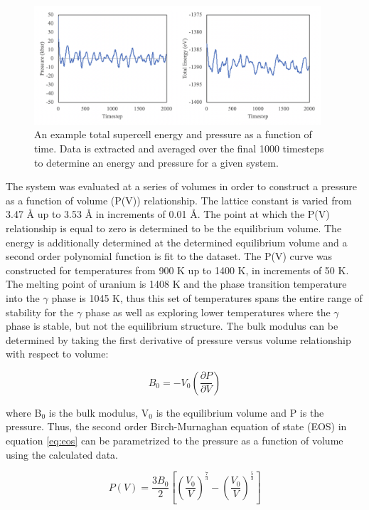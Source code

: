 \documentclass[review]{elsarticle}
\begin{document}
\begin{figure}[h]
 \centering
 \includegraphics[width=0.95\textwidth]{1_convergence.png} 
 \caption{An example total supercell energy and pressure as a function of time. Data is extracted and averaged over the final 1000 timesteps to determine an energy and pressure for a given system. }
 \label{fig:convergence}
\end{figure}

\FloatBarrier

The system was evaluated at a series of volumes in order to construct a pressure as a function of volume (P(V)) relationship. The lattice constant is varied from 3.47 {\AA} up to 3.53 {\AA} in increments of 0.01 {\AA}. The point at which the P(V) relationship is equal to zero is determined to be the equilibrium volume. The energy is additionally determined at the determined equilibrium volume and a second order polynomial function is fit to the dataset. The P(V) curve was constructed for temperatures from 900 K up to 1400 K, in increments of 50 K. The melting point of uranium is 1408 K and the phase transition temperature into the $\gamma$ phase is 1045 K, thus this set of temperatures spans the entire range of stability for the $\gamma$ phase as well as exploring lower temperatures where the $\gamma$ phase is stable, but not the equilibrium structure. The bulk modulus can be determined by taking the first derivative of pressure versus volume relationship with respect to volume:

\begin{equation}
\label{eq:bulk}
B_{0} = -V_0 \left( \frac{\partial P}{\partial V} \right)
\end{equation}

where B$_0$ is the bulk modulus, V$_0$ is the equilibrium volume and P is the pressure. Thus, the second order Birch-Murnaghan equation of state (EOS) in equation \ref{eq:eos} can be parametrized to the pressure as a function of volume using the calculated data. 

\begin{equation}
\label{eq:eos}
P(V) = \frac{3B_0}{2} \left[ \left(\frac{V_0}{V}\right)^{\frac{7}{3}} - \left(\frac{V_0}{V}\right)^{\frac{5}{3}} \right]
\end{equation}
\end{document}
